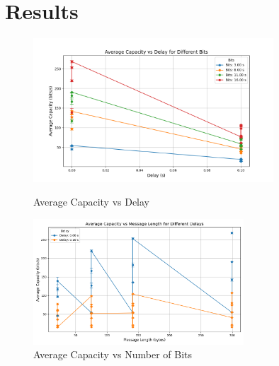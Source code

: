 \documentclass[10pt,a4paper]{article}
\begin{document}
\section*{Results}
\vspace{-2em}
\begin{figure}[H]
\centering
\includegraphics[width=0.8\textwidth]{capacity_vs_delay.png}
\caption{Average Capacity vs Delay}

\includegraphics[width=0.7\textwidth]{capacity_vs_length.png}
\caption{Average Capacity vs Number of Bits}
\end{figure}
\end{document}
